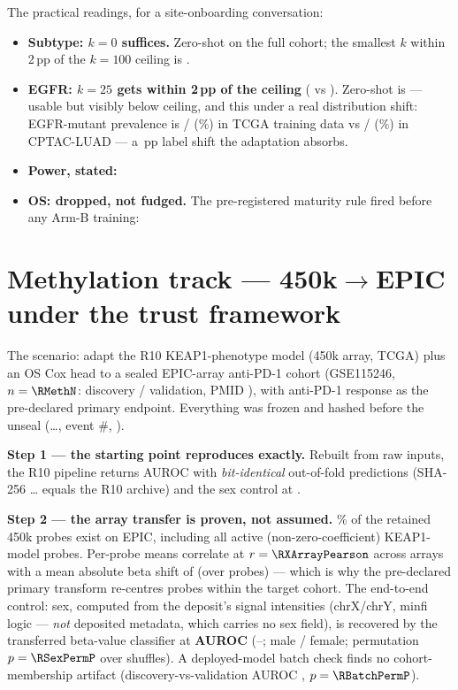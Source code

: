 \documentclass[11pt,a4paper]{article}
\begin{document}
The practical readings, for a site-onboarding conversation:
\begin{itemize}[leftmargin=1.2em,itemsep=2pt]
\item \textbf{Subtype: $k=0$ suffices.} Zero-shot \RSubZeroFull{} on the full cohort; the
smallest $k$ within 2\,pp of the $k=100$ ceiling is \RSubFtWithinTwoPP.
\item \textbf{EGFR: $k=25$ gets within 2\,pp of the ceiling} (\REgfrFtTwentyFive{} vs
\REgfrFtHundred). Zero-shot is \REgfrFtZero{} --- usable but visibly below ceiling, and this
under a real distribution shift: EGFR-mutant prevalence is \RShiftTcgaMut/\RShiftTcgaWt{}
(\RShiftTcgaPct\%) in TCGA training data vs \RShiftCptacMut/\RShiftCptacWt{}
(\RShiftCptacPct\%) in CPTAC-LUAD --- a \RShiftPP\,pp label shift the adaptation absorbs.
\item \textbf{Power, stated:} 
\item \textbf{OS: dropped, not fudged.} The pre-registered maturity rule fired before any Arm-B
training: 
\end{itemize}

\section{Methylation track --- 450k$\rightarrow$EPIC under the trust framework}

The scenario: adapt the R10 KEAP1-phenotype model (450k array, TCGA) plus an OS Cox head to a
sealed EPIC-array anti-PD-1 cohort (GSE115246, $n=\RMethN$: \RMethDiscovery{} discovery /
\RMethValidation{} validation, PMID \RMethPubmed), with anti-PD-1 response as the
pre-declared primary endpoint. Everything was frozen and hashed before the unseal
(\texttt{\RMethConfigShaShort}\ldots, event \#\RMethUnsealNum, \RMethUnsealUtc).

\textbf{Step 1 --- the starting point reproduces exactly.} Rebuilt from raw inputs, the R10
pipeline returns AUROC \RReproAuroc{} with \emph{bit-identical} out-of-fold predictions
(SHA-256 \texttt{\RReproOofSha}\ldots{} equals the R10 archive) and the sex control at
\RReproSexControl.

\textbf{Step 2 --- the array transfer is proven, not assumed.} \RRetainedOnEpicPct\% of the
\RRetainedProbes{} retained 450k probes exist on EPIC, including all \RKeapActive{} active
(non-zero-coefficient) KEAP1-model probes. Per-probe means correlate at $r=\RXArrayPearson$
across arrays with a mean absolute beta shift of \RXArrayMeanShift{} (over \RXArrayNProbes{}
probes) --- which is why the pre-declared primary transform re-centres probes within the
target cohort. The end-to-end control: sex, computed from the deposit's signal intensities
(chrX/chrY, minfi logic --- \emph{not} deposited metadata, which carries no sex field), is
recovered by the transferred beta-value classifier at \textbf{AUROC \RSexAuroc}
(\RSexLo--\RSexHi; \RSexMale{} male / \RSexFemale{} female; permutation
$p=\RSexPermP$ over \RSexNPerm{} shuffles). A deployed-model batch check finds no
cohort-membership artifact (discovery-vs-validation AUROC \RBatchAuroc, $p=\RBatchPermP$).
\end{document}
